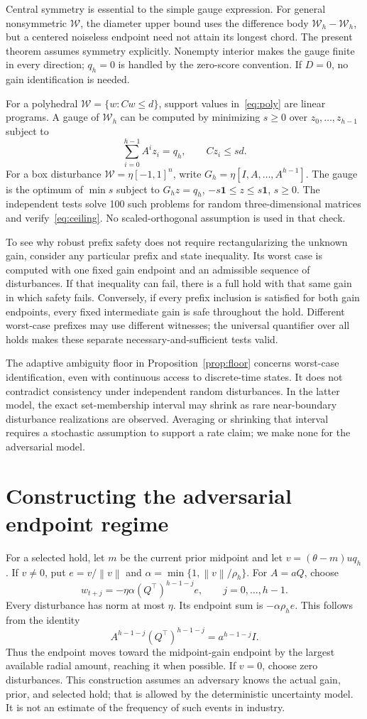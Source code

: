 \documentclass{l4dc2026}
\newcommand{\W}{\mathcal{W}}
\newcommand{\norm}[1]{\left\lVert #1\right\rVert}
\begin{document}
Central symmetry is essential to the simple gauge expression. For general nonsymmetric $\W$, the diameter upper bound uses the difference body $\W_h-\W_h$, but a centered noiseless endpoint need not attain its longest chord. The present theorem assumes symmetry explicitly. Nonempty interior makes the gauge finite in every direction; $q_h=0$ is handled by the zero-score convention. If $D=0$, no gain identification is needed.

For a polyhedral $\W=\{w:Cw\le d\}$, support values in~\eqref{eq:poly} are linear programs. A gauge of $\W_h$ can be computed by minimizing $s\ge0$ over $z_0,\ldots,z_{h-1}$ subject to
\[
 \sum_{i=0}^{h-1}A^iz_i=q_h,\qquad Cz_i\le s d.
\]
For a box disturbance $\W=\eta[-1,1]^n$, write $G_h=\eta[I,A,\ldots,A^{h-1}]$. The gauge is the optimum of
$\min s$ subject to $G_hz=q_h$, $-s\mathbf1\le z\le s\mathbf1$, $s\ge0$. The independent tests solve 100 such problems for random three-dimensional matrices and verify~\eqref{eq:ceiling}. No scaled-orthogonal assumption is used in that check.

To see why robust prefix safety does not require rectangularizing the unknown gain, consider any particular prefix and state inequality. Its worst case is computed with one fixed gain endpoint and an admissible sequence of disturbances. If that inequality can fail, there is a full hold with that same gain in which safety fails. Conversely, if every prefix inclusion is satisfied for both gain endpoints, every fixed intermediate gain is safe throughout the hold. Different worst-case prefixes may use different witnesses; the universal quantifier over all holds makes these separate necessary-and-sufficient tests valid.

The adaptive ambiguity floor in Proposition~\ref{prop:floor} concerns worst-case identification, even with continuous access to discrete-time states. It does not contradict consistency under independent random disturbances. In the latter model, the exact set-membership interval may shrink as rare near-boundary disturbance realizations are observed. Averaging or shrinking that interval requires a stochastic assumption to support a rate claim; we make none for the adversarial model.

\section{Constructing the adversarial endpoint regime}\label{app:adversary}
For a selected hold, let $m$ be the current prior midpoint and let
$v=(\theta-m)u q_h$. If $v\ne0$, put $e=v/\norm{v}$ and
$\alpha=\min\{1,\norm{v}/\rho_h\}$. For $A=aQ$, choose
\[
 w_{t+j}=-\eta\alpha(Q^\top)^{h-1-j}e,\qquad j=0,\ldots,h-1.
\]
Every disturbance has norm at most $\eta$. Its endpoint sum is
$-\alpha\rho_he$. This follows from the identity
\[A^{h-1-j}(Q^\top)^{h-1-j}=a^{h-1-j}I.\]
Thus the endpoint moves toward the midpoint-gain endpoint by the largest available radial amount, reaching it when possible. If $v=0$, choose zero disturbances. This construction assumes an adversary knows the actual gain, prior, and selected hold; that is allowed by the deterministic uncertainty model. It is not an estimate of the frequency of such events in industry.
\end{document}
